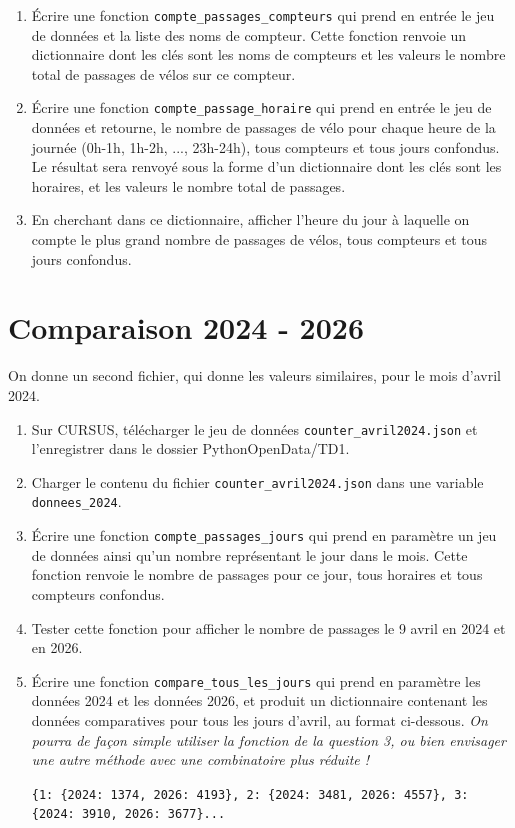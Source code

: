 \documentclass[11pt,a4paper]{article}
\begin{document}
\begin{enumerate}
\item Écrire une fonction \verb+compte_passages_compteurs+ qui prend en entrée le jeu de données et la liste des noms de compteur. Cette fonction renvoie un dictionnaire dont les clés sont les noms de compteurs et les valeurs le nombre total de passages de vélos sur ce compteur.

\item Écrire une fonction \verb+compte_passage_horaire+ qui prend en entrée le jeu de données et retourne, le nombre de passages de vélo pour chaque heure de la journée (0h-1h, 1h-2h, ..., 23h-24h), tous compteurs et tous jours confondus. Le résultat sera renvoyé sous la forme d'un dictionnaire dont les clés sont les horaires, et les valeurs le nombre total de passages.

\item En cherchant dans ce dictionnaire, afficher l'heure du jour à laquelle on compte le plus grand nombre de passages de vélos, tous compteurs et tous jours confondus.
\end{enumerate}

\section{Comparaison 2024 - 2026}

On donne un second fichier, qui donne les valeurs similaires, pour le mois d'avril 2024.
\begin{enumerate}
    \item Sur CURSUS, télécharger le jeu de données \verb+counter_avril2024.json+ et l'enregistrer dans le dossier PythonOpenData/TD1.
     \item Charger le contenu du fichier \verb+counter_avril2024.json+ dans une variable \verb+donnees_2024+.
    \item Écrire une fonction \verb+compte_passages_jours+ qui prend en paramètre un jeu de données ainsi qu'un nombre représentant le jour dans le mois. Cette fonction renvoie le nombre de passages pour ce jour, tous horaires et tous compteurs confondus. 
    \item Tester cette fonction pour afficher le nombre de passages le 9 avril en 2024 et en 2026.
    \item Écrire une fonction \verb+compare_tous_les_jours+ qui prend en paramètre les données 2024 et les données 2026, et produit un dictionnaire contenant les données comparatives pour tous les jours d'avril, au format ci-dessous.
    \emph{On pourra de façon simple utiliser la fonction de la question 3, ou bien envisager une autre méthode avec une combinatoire plus réduite ! }

    \verb+{1: {2024: 1374, 2026: 4193}, 2: {2024: 3481, 2026: 4557}, 3: {2024: 3910, 2026: 3677}...+
\end{enumerate}
    
\end{document}
